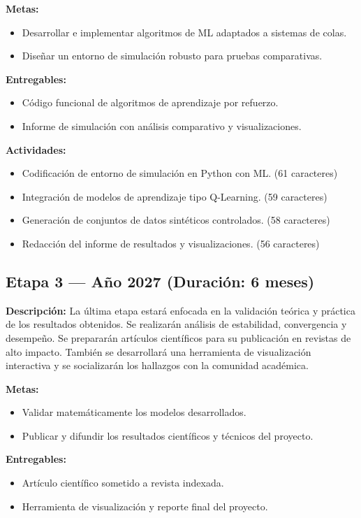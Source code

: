 \documentclass[12pt]{article}
\begin{document}
\textbf{Metas:}
\begin{itemize}
  \item Desarrollar e implementar algoritmos de ML adaptados a sistemas de colas.
  \item Diseñar un entorno de simulación robusto para pruebas comparativas.
\end{itemize}

\textbf{Entregables:}
\begin{itemize}
  \item Código funcional de algoritmos de aprendizaje por refuerzo.
  \item Informe de simulación con análisis comparativo y visualizaciones.
\end{itemize}

\textbf{Actividades:}
\begin{itemize}
  \item Codificación de entorno de simulación en Python con ML. (61 caracteres)
  \item Integración de modelos de aprendizaje tipo Q-Learning. (59 caracteres)
  \item Generación de conjuntos de datos sintéticos controlados. (58 caracteres)
  \item Redacción del informe de resultados y visualizaciones. (56 caracteres)
\end{itemize}

\subsection*{Etapa 3 — Año 2027 (Duración: 6 meses)}
\textbf{Descripción:} La última etapa estará enfocada en la validación teórica y práctica de los resultados obtenidos. Se realizarán análisis de estabilidad, convergencia y desempeño. Se prepararán artículos científicos para su publicación en revistas de alto impacto. También se desarrollará una herramienta de visualización interactiva y se socializarán los hallazgos con la comunidad académica.

\textbf{Metas:}
\begin{itemize}
  \item Validar matemáticamente los modelos desarrollados.
  \item Publicar y difundir los resultados científicos y técnicos del proyecto.
\end{itemize}

\textbf{Entregables:}
\begin{itemize}
  \item Artículo científico sometido a revista indexada.
  \item Herramienta de visualización y reporte final del proyecto.
\end{itemize}
\end{document}
